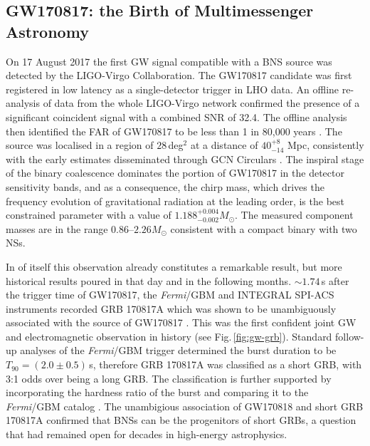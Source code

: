 \documentclass[binding=0.6cm, LaM]{sapthesis}
\begin{document}
\subsection{GW170817: the Birth of Multimessenger Astronomy}
\label{subsec:GW170817}
	On 17 August 2017 the first GW signal compatible with a BNS source 
	was detected by the LIGO-Virgo Collaboration.  
	The GW170817 candidate was first registered in low latency \cite{112,114}
	as a single-detector trigger in LHO data. 
	An offline re-analysis \cite{28,111} of data from the whole LIGO-Virgo network 
	confirmed the presence of a significant coincident signal with a combined SNR of 32.4.
	The offline analysis then identified the FAR of GW170817 to be less than 1 in 80,000 years \cite{61}. 
	The source was localised \cite{59,152} in a region of $28\,$deg$^2$ at a distance of $40^{+8}_{-14}$ Mpc, 
	consistently with the early estimates disseminated through GCN Circulars \cite{55,60}.
	The inspiral stage of the binary coalescence dominates 
	the portion of GW170817 in the detector sensitivity bands, 
	and as a consequence, the chirp mass, 
	which drives the frequency evolution of gravitational radiation at the leading order, 
	is the best constrained parameter with a value of $1.188^{+0.004}_{-0.002}M_\odot$.
	The measured component masses are in the range $0.86$--$2.26M_\odot$
	consistent with a compact binary with two NSs.

        In of itself this observation already constitutes a remarkable result, 
	but more historical results poured in that day and in the following months.  
	$\sim1.74$\,s after the trigger time of GW170817, the {\it Fermi}/GBM and INTEGRAL SPI-ACS instruments 
	recorded GRB 170817A \cite{147} which was shown to be unambiguously associated 
	with the source of GW170817 \cite{55}.  
	This was the first confident joint GW and electromagnetic observation in history (see Fig.\,\ref{fig:gw-grb}).
	Standard follow-up analyses \cite{108,110} of the {\it Fermi}/GBM trigger 
	determined the burst duration to be $T_{90} = (2.0 \pm 0.5)\,$s,
	therefore GRB 170817A was classified as a short GRB, with 3:1 odds over being a long GRB.
        The classification is further supported by incorporating 
	the hardness ratio of the burst and comparing it to the {\it Fermi}/GBM catalog \cite{110}.  
	The unambigious association of GW170818 and short GRB 170817A confirmed that BNSs 
	can be the progenitors of short GRBs, a question that had remained open for decades in high-energy astrophysics.
\end{document}

